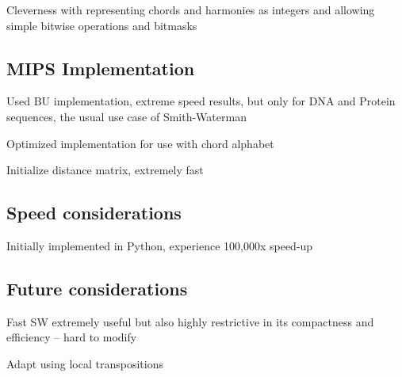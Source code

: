 \item Cleverness with representing chords and harmonies as integers and allowing simple bitwise operations and bitmasks

\subsection{MIPS Implementation}

\item Used BU implementation, extreme speed results, but only for DNA and Protein sequences, the usual use case of Smith-Waterman

\item Optimized implementation for use with chord alphabet

\item Initialize distance matrix, extremely fast

\subsection{Speed considerations}

\item Initially implemented in Python, experience 100,000x speed-up

\subsection{Future considerations}

\item Fast SW extremely useful but also highly restrictive in its compactness and efficiency -- hard to modify

\item Adapt using local transpositions